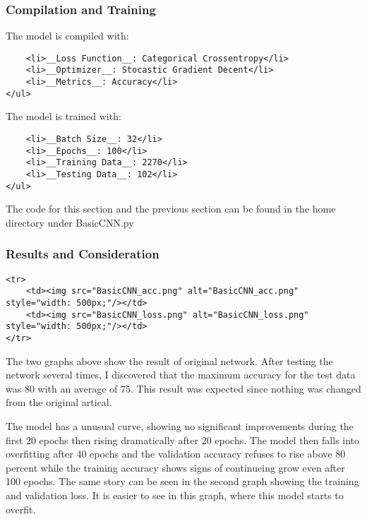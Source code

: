\documentclass[11pt]{article}
\begin{document}
    \subsubsection{Compilation and Training}\label{compilation-and-training}

    The model is compiled with:

\begin{verbatim}
    <li>__Loss Function__: Categorical Crossentropy</li>
    <li>__Optimizer__: Stocastic Gradient Decent</li>
    <li>__Metrics__: Accuracy</li>
</ul>
\end{verbatim}

The model is trained with:

\begin{verbatim}
    <li>__Batch Size__: 32</li>
    <li>__Epochs__: 100</li>
    <li>__Training Data__: 2270</li>
    <li>__Testing Data__: 102</li>
</ul>
\end{verbatim}

The code for this section and the previous section can be found in the
home directory under BasicCNN.py

    \subsubsection{Results and
Consideration}\label{results-and-consideration}

\begin{verbatim}
<tr>
    <td><img src="BasicCNN_acc.png" alt="BasicCNN_acc.png" style="width: 500px;"/></td>
    <td><img src="BasicCNN_loss.png" alt="BasicCNN_loss.png" style="width: 500px;"/></td>
</tr>
\end{verbatim}

    The two graphs above show the result of original network. After testing
the network several times, I discovered that the maximum accuracy for
the test data was 80 with an average of 75. This result was expected
since nothing was changed from the original artical.

The model has a unusual curve, showing no significant improvements
during the first 20 epochs then rising dramatically after 20 epochs. The
model then falls into overfitting after 40 epochs and the validation
accuracy refuses to rise above 80 percent while the training accuracy
shows signs of continueing grow even after 100 epochs. The same story
can be seen in the second graph showing the training and validation
loss. It is easier to see in this graph, where this model starts to
overfit.
\end{document}
